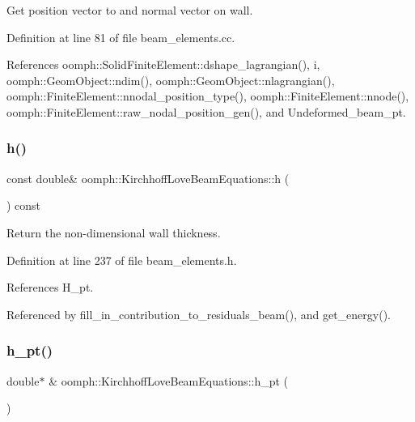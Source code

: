 Get position vector to and normal vector on wall. 



Definition at line 81 of file beam\+\_\+elements.\+cc.



References oomph\+::\+Solid\+Finite\+Element\+::dshape\+\_\+lagrangian(), i, oomph\+::\+Geom\+Object\+::ndim(), oomph\+::\+Geom\+Object\+::nlagrangian(), oomph\+::\+Finite\+Element\+::nnodal\+\_\+position\+\_\+type(), oomph\+::\+Finite\+Element\+::nnode(), oomph\+::\+Finite\+Element\+::raw\+\_\+nodal\+\_\+position\+\_\+gen(), and Undeformed\+\_\+beam\+\_\+pt.

\mbox{\label{classoomph_1_1KirchhoffLoveBeamEquations_ad6fab6e7853b702cfe319b957b59c37f}} 
\subsubsection{\texorpdfstring{h()}{h()}}
{\footnotesize\ttfamily const double\& oomph\+::\+Kirchhoff\+Love\+Beam\+Equations\+::h (\begin{DoxyParamCaption}{ }\end{DoxyParamCaption}) const\hspace{0.3cm}{\ttfamily [inline]}}



Return the non-\/dimensional wall thickness. 



Definition at line 237 of file beam\+\_\+elements.\+h.



References H\+\_\+pt.



Referenced by fill\+\_\+in\+\_\+contribution\+\_\+to\+\_\+residuals\+\_\+beam(), and get\+\_\+energy().

\mbox{\label{classoomph_1_1KirchhoffLoveBeamEquations_a269ed76cccc247c9dfdbe0750b09db3a}} 
\subsubsection{\texorpdfstring{h\+\_\+pt()}{h\_pt()}}
{\footnotesize\ttfamily double$\ast$ \& oomph\+::\+Kirchhoff\+Love\+Beam\+Equations\+::h\+\_\+pt (\begin{DoxyParamCaption}{ }\end{DoxyParamCaption})\hspace{0.3cm}{\ttfamily [inline]}}



